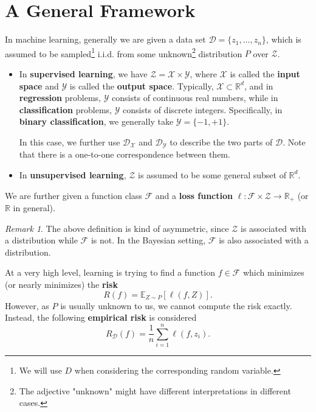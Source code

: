 \documentclass[openany]{book}
\theoremstyle{definition}
\theoremstyle{remark}
\newtheorem*{remark}{Remark}
\begin{document}
\section{A General Framework}
In machine learning, generally we are given a data set $\mathcal{D}=\{z_1,\ldots,z_n\}$, which is assumed to be sampled\footnote{We will use $D$ when considering the corresponding random variable.} i.i.d. from some unknown\footnote{The adjective "unknown" might have different interpretations in different cases.} distribution $P$ over $\mathcal{Z}$.
\begin{itemize}
    \item In \textbf{supervised learning}, we have $\mathcal{Z}=\mathcal{X}\times \mathcal{Y}$, where $\mathcal{X}$ is called the \textbf{input space} and $\mathcal{Y}$ is called the \textbf{output space}. Typically, $\mathcal{X}\subset \mathbb{R}^d$, and in \textbf{regression} problems, $\mathcal{Y}$ consists of continuous real numbers, while in \textbf{classification} problems, $\mathcal{Y}$ consists of discrete integers. Specifically, in \textbf{binary classification}, we generally take $\mathcal{Y}=\{-1,+1\}$.

    In this case, we further use $\mathcal{D}_{\mathcal{X}}$ and $\mathcal{D}_{\mathcal{Y}}$ to describe the two parts of $\mathcal{D}$. Note that there is a one-to-one correspondence between them.

    \item In \textbf{unsupervised learning}, $\mathcal{Z}$ is assumed to be some general subset of $\mathbb{R}^d$.
\end{itemize}

We are further given a function class $\mathcal{F}$ and a \textbf{loss function} $\ell:\mathcal{F}\times \mathcal{Z}\to \mathbb{R}_+$ (or $\mathbb{R}$ in general).
\begin{remark}
    The above definition is kind of asymmetric, since $\mathcal{Z}$ is associated with a distribution while $\mathcal{F}$ is not. In the Bayesian setting, $\mathcal{F}$ is also associated with a distribution.
\end{remark}

At a very high level, learning is trying to find a function $f\in \mathcal{F}$ which minimizes (or nearly minimizes) the \textbf{risk}
\begin{equation}\label{risk}
    R(f)=\mathbb{E}_{Z\sim P}\left[\ell(f,Z)\right].
\end{equation}
However, as $P$ is usually unknown to us, we cannot compute the risk exactly. Instead, the following \textbf{empirical risk} is considered
\begin{equation}\label{empRisk}
    R_{\mathcal{D}}(f)=\frac{1}{n}\sum_{i=1}^{n}\ell(f,z_i).
\end{equation}
\end{document}
